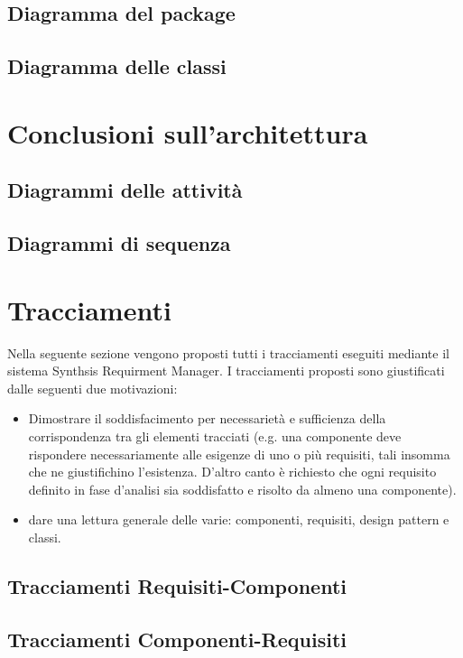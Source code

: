 \subsection{Diagramma del package}

\subsection{Diagramma delle classi}
\clearpage

\section{Conclusioni sull'architettura}

\subsection{Diagrammi delle attività}

\subsection{Diagrammi di sequenza}
\clearpage

\section{Tracciamenti}
Nella seguente sezione vengono proposti tutti i tracciamenti eseguiti mediante il sistema Synthsis Requirment Manager. I tracciamenti proposti sono giustificati dalle seguenti due motivazioni:

\begin{itemize}
	\item Dimostrare il soddisfacimento per necessarietà e sufficienza della corrispondenza tra gli elementi tracciati (e.g. una componente deve rispondere necessariamente alle esigenze di uno o più requisiti, tali insomma che ne giustifichino l'esistenza. D'altro canto è richiesto che ogni requisito definito in fase d'analisi sia soddisfatto e risolto da almeno una componente).
	\item dare una lettura generale delle varie: componenti, requisiti, design pattern e classi.
\end{itemize}

\subsection{Tracciamenti Requisiti-Componenti}

\subsection{Tracciamenti Componenti-Requisiti}

